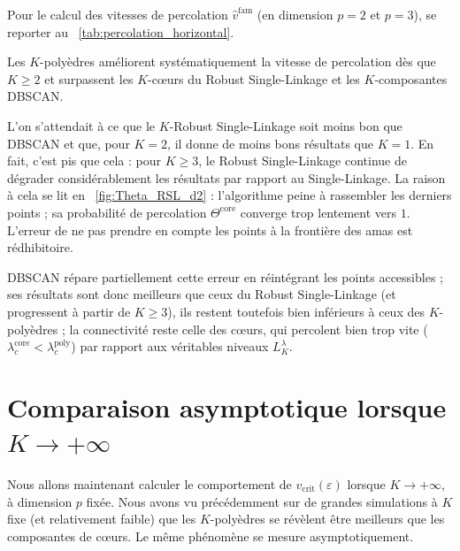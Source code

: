 Pour le calcul des vitesses de percolation $\widehat v^{\mathrm{fam}}$ (en dimension $p=2$ et $p=3$), se reporter au \Tab~\ref{tab:percolation_horizontal}.


Les $K$-polyèdres améliorent systématiquement la vitesse de percolation dès que $K\ge2$ et surpassent les $K$-cœurs du Robust Single-Linkage et les $K$-composantes DBSCAN. 

L'on s'attendait à ce que le $K$-Robust Single-Linkage soit moins bon que DBSCAN et que, pour $K=2$, il donne de moins bons résultats que $K=1$. 
En fait, c'est pis que cela : pour $K\ge3$, le Robust Single-Linkage continue de dégrader considérablement les résultats par rapport au Single-Linkage. La raison à cela se lit en \Fig~\ref{fig:Theta_RSL_d2} : l'algorithme peine à rassembler les derniers points ; sa probabilité de percolation $\Theta^{\mathrm{core}}$ converge trop lentement vers $1$. L'erreur de ne pas prendre en compte les points à la frontière des amas est rédhibitoire.

DBSCAN répare partiellement cette erreur en réintégrant les points accessibles ; ses résultats sont donc meilleurs que ceux du Robust Single-Linkage (et progressent à partir de $K \ge3$), ils restent toutefois bien inférieurs à ceux des $K$-polyèdres ; la connectivité reste celle des cœurs, qui percolent bien trop vite ($\lambda_c^{\mathrm{core}} < \lambda_c^{\mathrm{poly}}$) par rapport aux véritables niveaux $L_K^\lambda$.


\section{Comparaison asymptotique lorsque $K\to+\infty$}

Nous allons maintenant calculer le comportement de $v_{\mathrm{crit}}(\varepsilon)$ lorsque $K\to+\infty$, à dimension $p$ fixée. Nous avons vu précédemment sur de grandes simulations à $K$ fixe (et relativement faible) que les $K$-polyèdres se révèlent être meilleurs que les composantes de cœurs. 
Le même phénomène se mesure asymptotiquement.


